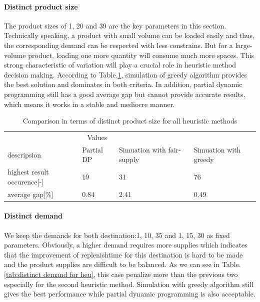 \documentclass{article}
\begin{document}
\paragraph{Distinct product size}
The product sizes of 1, 20 and 39 are the key parameters in this section. Technically speaking, a product with small volume can be loaded easily and thus, the corresponding demand can be respected with less constrains. But for a large-volume product, loading one more quantity will consume much more spaces. This strong characteristic of variation will play a crucial role in heuristic method decision making. According to Table.\ref{tab:distinct product size for heu}, simulation of greedy algorithm provides the best solution and dominates in both criteria. In addition, partial dynamic programming still has a good average gap but cannot provide accurate results, which means it works in a stable and mediocre manner. 

\begin{table}[ht]
 \caption{Comparison in terms of distinct product size for all heuristic methods}
  \centering
  \begin{tabular}{llll}
    \toprule
    \multicolumn{3}{c}{Values}                   \\
    \cmidrule(r){2-3}
    descripsion   & Partial DP    & Simuation with fair-supply      & Simuation with greedy \\
    \midrule
    highest result occurence[-]	&	19 	&	31 	&	76	\\
    average gap[\%]	&	0.84	&	2.41 	&	0.49 	\\
    \bottomrule
  \end{tabular}
  \label{tab:distinct product size for heu}
\end{table}

\paragraph{Distinct demand}
We keep the demands for both destination:1, 10, 35 and 1, 15, 30 as fixed parameters. Obviously, a higher demand requires more supplies which indicates that the improvement of replenishtime for this destination is hard to be made and the product supplies are difficult to be balanced. As we can see in Table.\ref{tab:distinct demand for heu}, this case penalize more than the previous two especially for the second heuristic method. Simulation with greedy algorithm still gives the best performance while partial dynamic programming is also acceptable.
\end{document}
